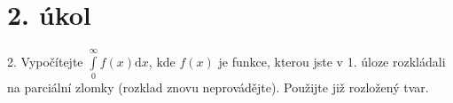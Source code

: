 \section{2. úkol}
  2. Vypočítejte  $\int\limits_0^\infty f(x) \mathrm{d}x$, kde $f(x)$ je funkce, kterou jste v 1. úloze rozkládali na parciální zlomky (rozklad znovu neprovádějte). Použijte již rozložený tvar.
